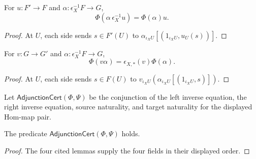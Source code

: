 \begin{lemma}
\label{lemma:weil-efi-site-adjunction-hom-source-naturality}
For $u:F'\to F$ and $\alpha:\epsilon_X^{-1}F\to G$,
\[
 \Phi(\alpha\,\epsilon_X^{-1}u)=\Phi(\alpha)u.
\]
\end{lemma}
\begin{proof}
At $U$, each side sends $s\in F'(U)$ to
$\alpha_{\iota_XU}[(1_{\iota_XU},u_U(s))]$.
\end{proof}

\begin{lemma}
\label{lemma:weil-efi-site-adjunction-hom-target-naturality}
For $v:G\to G'$ and $\alpha:\epsilon_X^{-1}F\to G$,
\[
 \Phi(v\alpha)=\epsilon_{X,*}(v)\Phi(\alpha).
\]
\end{lemma}
\begin{proof}
At $U$, each side sends $s\in F(U)$ to
$v_{\iota_XU}(\alpha_{\iota_XU}[(1_{\iota_XU},s)])$.
\end{proof}

\begin{definition}
\label{def:weil-efi-site-sheaf-adjunction-certificate}
Let $\mathsf{AdjunctionCert}(\Phi,\Psi)$ be the conjunction of the left
inverse equation, the right inverse equation, source naturality, and target
naturality for the displayed Hom-map pair.
\end{definition}

\begin{proposition}
\label{prop:weil-efi-site-sheaf-adjunction-certificate}
The predicate $\mathsf{AdjunctionCert}(\Phi,\Psi)$ holds.
\end{proposition}
\begin{proof}
The four cited lemmas supply the four fields in their displayed order.
\end{proof}

